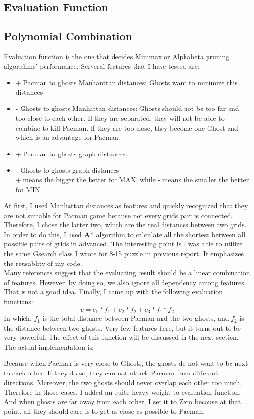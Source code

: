 \documentclass[a4paper, 11pt]{article}
\begin{document}
\subsection{Evaluation Function}
\subsection{Polynomial Combination}
Evaluation function is the one that decides Minimax or Alphabeta pruning algorithms' performance. Serveral features that I have tested are:
\begin{itemize}
\item{+} Pacman to ghosts Manhanttan distances: Ghosts want to minimize this distances
\item{-} Ghosts to ghosts Manhattan distances: Ghosts should not be too far and too close to each other. If they are separated, they will not be able to combine to kill Pacman. If they are too close, they become one Ghost and which is an advantage for Pacman.
\item{+} Pacman to ghosts graph distances:
\item{-} Ghosts to ghosts graph distances \\
  + means the bigger the better for MAX, while - means the smaller the better for MIN
\end{itemize}
At first, I used Manhattan distances as features and quickly recognized that they are not suitable for Pacman game because not every grids pair is connected. Therefore, I chose the latter two, which are the real distances between two grids. In order to do this, I used \textbf{A*} algorithm to calculate all the shortest between all possible pairs of grids in advanced. The interesting point is I was able to utilize the same Gsearch class I wrote for 8-15 puzzle in previous report. It emphasizes the reusablity of my code. \\
Many references suggest that the evaluating result should be a linear combination of features. However, by doing so, we also ignore all dependency among features. That is not a good idea. Finally, I came up with the following evaluation functions: 
\[ v = c_1*f_1+c_2*f_2+c_3*f_1*f_2\]
In which, $f_1$ is the total distance between Pacman and the two ghosts, and $f_2$ is the distance between two ghosts. Very few features here, but it turns out to be very powerful. The effect of this function will be discussed in the next section. \\
The actual implementation is:

Because when Pacman is very close to Ghosts, the ghosts do not want to be next to each other. If they do so, they can not attack Pacman from different directions. Moreover, the two ghosts should never overlap each other too much. Therefore in those cases, I added an quite heavy weight to evaluation function. And when ghosts are far away from each other, I set it to Zero because at that point, all they should care is to get as close as possible to Pacman.
\end{document}
